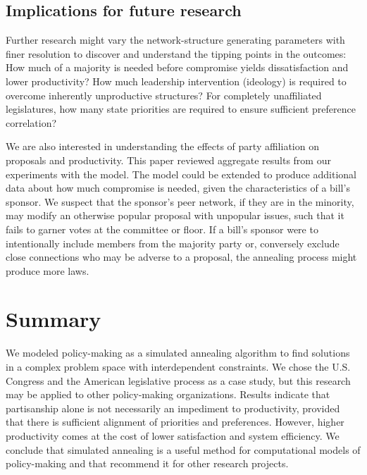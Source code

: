 \documentclass[pdftex,12pt,oribibl]{llncs}
\begin{document}
\subsection{Implications for future research}
Further research might vary the network-structure generating parameters with finer resolution to discover and understand the tipping points in the outcomes:
How much of a majority is needed before compromise yields dissatisfaction and lower productivity? 
How much leadership intervention (ideology) is required to overcome inherently unproductive structures?  
For completely unaffiliated legislatures, how many state priorities are required to ensure sufficient preference correlation?

We are also interested in understanding the effects of party affiliation on proposals and productivity. This paper reviewed aggregate results from our experiments with the model.
The model could be extended to produce additional data about how much compromise is needed, given the characteristics of a bill's sponsor.
We suspect that the sponsor's peer network, if they are in the minority, may modify an otherwise popular proposal with unpopular issues, such that it fails to garner votes at the committee or floor.
If a bill's sponsor were to intentionally include members from the majority party or, conversely exclude close connections who may be adverse to a proposal, the annealing process might produce more laws.

\section{Summary}
We modeled policy-making as a simulated annealing algorithm to find solutions in a complex problem space with interdependent constraints.
We chose the U.S. Congress and the American legislative process as a case study, but this research may be applied to other policy-making organizations.
Results indicate that partisanship alone is not necessarily an impediment to productivity, provided that there is sufficient alignment of priorities and preferences.
However, higher productivity comes at the cost of lower satisfaction and system efficiency.
We conclude that simulated annealing is a useful method for computational models of policy-making and that recommend it for other research projects.
\end{document}

